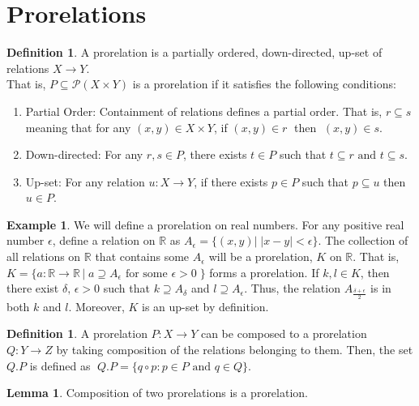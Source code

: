 \documentclass[a4paper]{article}
\theoremstyle{definition}
\newtheorem{definition}[theorem]{Definition}
\newtheorem{lemma}[theorem]{Lemma}
\newtheorem{example}[theorem]{Example}
\begin{document}
			\section{Prorelations}
			\begin{definition}%
				A prorelation is a partially ordered, down-directed, up-set of relations $X \to Y$.\\
				That is, $P \subseteq \mathcal{P}(X \times Y)$ is a prorelation if it satisfies the
				following conditions:
				\begin{enumerate}[label=(\roman*)]
					\item Partial Order: Containment of relations defines a partial order.
						That is, $r \subseteq s$  meaning that for any $(x,y) \in X \times Y$,
						if  $(x,y)\in r\;$ then $\;(x,y)\in s$.
					\item Down-directed: For any $r,s \in P$, there exists $t \in P $ such that
						$t\subseteq r \text{ and } t \subseteq s$.
					\item Up-set: For any relation $u:X\to Y$, if there exists $p \in P$ such that
						$p \subseteq u $ then $u \in P$.
				\end{enumerate}
			\end{definition}
			\begin{example} %
				We will define a prorelation on real numbers.
				For any positive real number $\epsilon$, define a relation on $\mathbb{R}$ as
				$A_\epsilon=\{ (x,y) |\; |x-y|<\epsilon \}$.
				The collection of all relations on $\mathbb{R}$ that contains some
				$A_\epsilon$ will be a prorelation, $K$ on $\mathbb{R}$.
				That is, $K=\{ a:\mathbb{R} \to \mathbb{R} \, | \; a \supseteq A_\epsilon \text{ for some } \epsilon>0 \; \}$ forms a prorelation.
				If $k,l \in K$, then there exist $\delta ,\, \epsilon > 0$ such that
				$k \supseteq A_\delta$ and $l \supseteq A_\epsilon$. Thus, the relation $A_{
				\frac{\delta+\epsilon}{2}}$ is in both $k$ and $l$. Moreover,
				$K$ is an up-set by definition.
			\end{example}
			\begin{definition}%
				A prorelation $P:X \to Y$ can be composed to a prorelation $Q:Y \to Z$ by taking
				composition of the relations belonging to them. Then, the set $Q.P$ is defined as
				$\; Q.P=\{q \circ p : p \in P \text{ and } q \in Q  \}$.
			\end{definition}
			\begin{lemma}
				Composition of two prorelations is a prorelation.
			\end{lemma}
\end{document}
